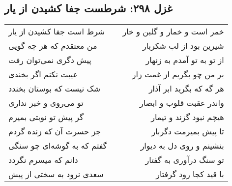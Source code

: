 \begin{center}
\section*{غزل ۲۹۸: شرطست جفا کشیدن از یار}
\label{sec:298}
\begin{longtable}{l p{0.5cm} r}
شرط است جفا کشیدن از یار
&&
خمر است و خمار و گلبن و خار
\\
من معتقدم که هر چه گویی
&&
شیرین بود از لب شکربار
\\
پیش دگری نمی‌توان رفت
&&
از تو به تو آمدم به زنهار
\\
عیبت نکنم اگر بخندی
&&
بر من چو بگریم از غمت زار
\\
شک نیست که بوستان بخندد
&&
هر گه که بگرید ابر آذار
\\
تو می‌روی و خبر نداری
&&
واندر عقبت قلوب و ابصار
\\
گر پیش تو نوبتی بمیرم
&&
هیچم نبود گزند و تیمار
\\
جز حسرت آن که زنده گردم
&&
تا پیش بمیرمت دگربار
\\
گفتم که به گوشه‌ای چو سنگی
&&
بنشینم و روی دل به دیوار
\\
دانم که میسرم نگردد
&&
تو سنگ درآوری به گفتار
\\
سعدی نرود به سختی از پیش
&&
با قید کجا رود گرفتار
\\
\end{longtable}
\end{center}
